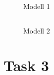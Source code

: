 \subsection{}
\begin{figure}[htbp]
  \centering
  \caption{Modell 1}
\end{figure}

\subsection{}
\begin{figure}[htbp]
  \centering
  \caption{Modell 2}
\end{figure}

\section{Task 3}

\printbibliography %


